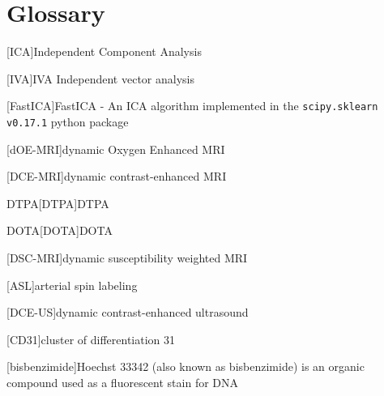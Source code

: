 
\chapter{Glossary}




\begin{acronym}

[ICA]{Independent Component Analysis}%

[IVA]{IVA Independent vector analysis}

[FastICA]{FastICA -  An ICA algorithm implemented in the \texttt{scipy.sklearn v0.17.1} python package}

[dOE-MRI]{dynamic Oxygen Enhanced MRI}%

[DCE-MRI]{dynamic contrast-enhanced MRI}

\acs{DTPA}[DTPA]{DTPA}

\acs{DOTA}[DOTA]{DOTA}

[DSC-MRI]{dynamic susceptibility weighted MRI}

[ASL]{arterial spin labeling}

[DCE-US]{dynamic contrast-enhanced ultrasound}%

[CD31]{cluster of differentiation 31}%

[bisbenzimide]{Hoechst 33342 (also known as bisbenzimide) is an organic compound used as a fluorescent stain for DNA}


\end{acronym}
